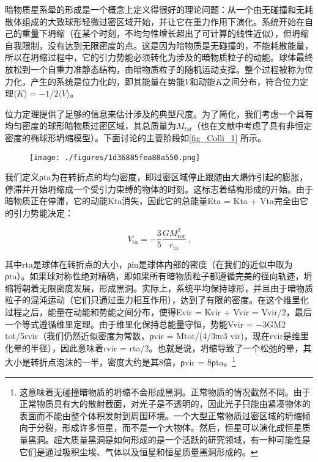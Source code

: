 
暗物质星系晕的形成是一个概念上定义得很好的理论问题：从一个由无碰撞和无耗散体组成的大致球形轻微过密区域开始，并让它在重力作用下演化。系统开始在自己的重量下坍缩（在某个时刻，不均匀性增长超出了可计算的线性近似），但坍缩自我限制，没有达到无限密度的点。这是因为暗物质是无碰撞的，不能耗散能量，所以在坍缩过程中，它的引力势能必须转化为涉及的暗物质粒子的动能。球体最终放松到一个自重力准静态结构，由暗物质粒子的随机运动支撑。整个过程被称为位力化，产生的系统是位力化的，即其能量在势能$V$和动能$K$之间分布，符合位力定理$\langle K\rangle  = -1/2 \langle V\rangle $。

位力定理提供了足够的信息来估计涉及的典型尺度。为了简化，我们考虑一个具有均匀密度的球形暗物质过密区域，其总质量为$M_{tot}$（也在文献中考虑了具有非恒定密度的椭球形坍缩模型）。下面讨论的主要阶段如\autoref{fig_Colli_1} 所示。
\begin{figure}[ht]
\centering
\texttt{[image: ./figures/1d36885fea88a550.png]}
\caption{} \label{fig_Colli_1}
\end{figure}

我们定义ρta为在转折点的均匀密度，即过密区域停止跟随由大爆炸引起的膨胀，停滞并开始坍缩成一个受引力束缚的物体的时刻。这标志着结构形成的开始。由于暗物质正在停滞，它的动能Kta消失，因此它的总能量Eta = Kta + Vta完全由它的引力势能决定：

\[ V_{\text{ta}} = -\frac{3}{5} \frac{G M_{\text{tot}}^2}{r_{\text{ta}}} ~.\]

其中rta是球体在转折点的大小，ρin是球体内部的密度（在我们的近似中取为ρta）。如果球对称性绝对精确，即如果所有暗物质粒子都遵循完美的径向轨迹，坍缩将朝着无限密度发展，形成黑洞。实际上，系统平均保持球形，并且由于暗物质粒子的混沌运动（它们只通过重力相互作用），达到了有限的密度。在这个维里化过程之后，能量在动能和势能之间分布，使得Evir = Kvir + Vvir = Vvir/2，最后一个等式遵循维里定理。由于维里化保持总能量守恒，势能Vvir = −3GM2 tot/5rvir（我们仍然近似密度为常数，ρvir = Mtot/(4/3πr3 vir)，现在rvir是维里化晕的半径），因此意味着rvir = rta/2。也就是说，坍缩导致了一个松弛的晕，其大小是转折点泡沫的一半，密度大约是其8倍，ρvir = 8ρta。\footnote{这意味着无碰撞暗物质的坍缩不会形成黑洞。正常物质的情况截然不同。由于正常物质具有大的散射截面，对光子是不透明的，因此光子只能由紧凑物体的表面而不能由整个体积发射到周围环境。一个大型正常物质过密区域的坍缩倾向于分裂，形成许多恒星，而不是一个大物体。然后，恒星可以演化成恒星质量黑洞。超大质量黑洞是如何形成的是一个活跃的研究领域，有一种可能性是它们是通过吸积尘埃、气体以及恒星和恒星质量黑洞形成的。}

